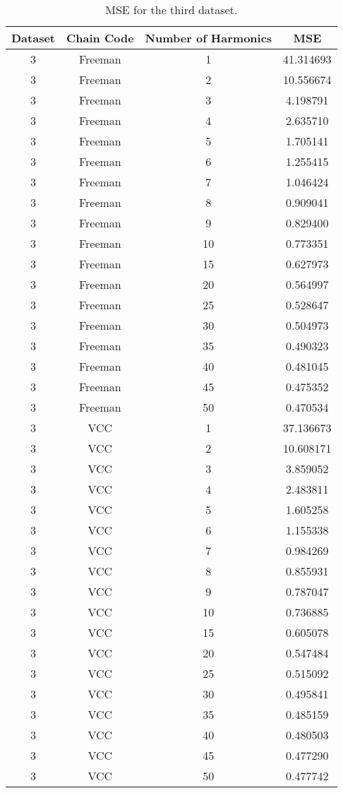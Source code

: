 \documentclass[thesis.tex]{subfiles}
\begin{document}
\begin{table}
\centering
 \begin{tabular}{c c c c} 
 \toprule
 Dataset &  Chain Code & Number of Harmonics & MSE\\ [0.5ex] 
 \midrule
3 & Freeman & 1  & 41.314693 \\
3 & Freeman & 2  & 10.556674 \\
3 & Freeman & 3  & 4.198791  \\
3 & Freeman & 4  & 2.635710  \\
3 & Freeman & 5  & 1.705141  \\
3 & Freeman & 6  & 1.255415  \\
3 & Freeman & 7  & 1.046424  \\
3 & Freeman & 8  & 0.909041  \\
3 & Freeman & 9  & 0.829400  \\
3 & Freeman & 10 & 0.773351  \\
3 & Freeman & 15 & 0.627973  \\
3 & Freeman & 20 & 0.564997  \\
3 & Freeman & 25 & 0.528647  \\
3 & Freeman & 30 & 0.504973  \\
3 & Freeman & 35 & 0.490323  \\
3 & Freeman & 40 & 0.481045  \\
3 & Freeman & 45 & 0.475352  \\
3 & Freeman & 50 & 0.470534 \\
3 & VCC & 1  & 37.136673 \\
3 & VCC & 2  & 10.608171 \\
3 & VCC & 3  & 3.859052  \\
3 & VCC & 4  & 2.483811  \\
3 & VCC & 5  & 1.605258  \\
3 & VCC & 6  & 1.155338  \\
3 & VCC & 7  & 0.984269  \\
3 & VCC & 8  & 0.855931  \\
3 & VCC & 9  & 0.787047  \\
3 & VCC & 10 & 0.736885  \\
3 & VCC & 15 & 0.605078  \\
3 & VCC & 20 & 0.547484  \\
3 & VCC & 25 & 0.515092  \\
3 & VCC & 30 & 0.495841  \\
3 & VCC & 35 & 0.485159  \\
3 & VCC & 40 & 0.480503  \\
3 & VCC & 45 & 0.477290  \\
3 & VCC & 50 & 0.477742 \\
\bottomrule
\end{tabular}
\caption{MSE for the third dataset.}
\label{mse_3}
\end{table}
\end{document}
